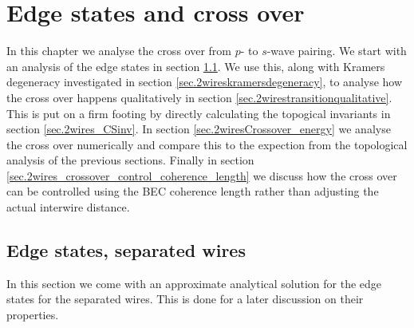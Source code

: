 
\chapter{Edge states and cross over} %

\label{Chapter10} %


In this chapter we analyse the cross over from $p$- to $s$-wave pairing. We start with an analysis of the edge states in section \ref{sec.2wiresedgestatesedgestates}. We use this, along with Kramers degeneracy investigated in section \ref{sec.2wireskramersdegeneracy}, to analyse how the cross over happens qualitatively in section \ref{sec.2wirestransitionqualitative}. This is put on a firm footing by directly calculating the topogical invariants in section \ref{sec.2wires_CSinv}. In section \ref{sec.2wiresCrossover_energy} we analyse the cross over numerically and compare this to the expection from the topological analysis of the previous sections. Finally in section \ref{sec.2wires_crossover_control_coherence_length} we discuss how the cross over can be controlled using the BEC coherence length rather than adjusting the actual interwire distance. 

\section{Edge states, separated wires}
\label{sec.2wiresedgestatesedgestates}
In this section we come with an approximate analytical solution for the edge states for the separated wires. This is done for a later discussion on their properties.

